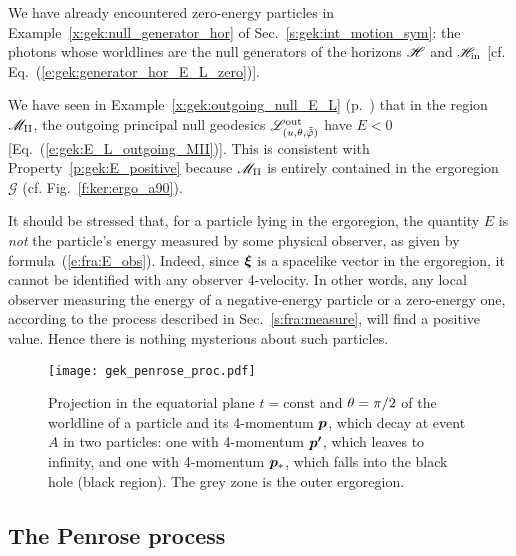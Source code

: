 \begin{example}
We have already encountered zero-energy particles in Example~\ref{x:gek:null_generator_hor} of Sec.~\ref{s:gek:int_motion_sym}: the photons whose worldlines are the null generators of the horizons $\mathscr{H}$
and $\mathscr{H}_{\rm in}$ [cf. Eq.~(\ref{e:gek:generator_hor_E_L_zero})].
\end{example}

\begin{example}
We have seen in Example~\ref{x:gek:outgoing_null_E_L} (p.~\pageref{x:gek:outgoing_null_E_L})
that in the region $\mathscr{M}_{\rm II}$, the outgoing principal null geodesics $\mathscr{L}^{\rm out}_{(u,\theta,\tilde{{\tilde\varphi}})}$ have $E<0$ [Eq.~(\ref{e:gek:E_L_outgoing_MII})]. This is consistent with
Property~\ref{p:gek:E_positive} because $\mathscr{M}_{\rm II}$ is entirely contained in the ergoregion $\mathscr{G}$
(cf. Fig.~\ref{f:ker:ergo_a90}).
\end{example}

\begin{remark}
It should be stressed that, for a particle lying in the ergoregion,
the quantity $E$ is \emph{not} the particle's energy measured by some
physical observer, as given by formula~(\ref{e:fra:E_obs}).
Indeed, since $\bm{\xi}$ is a spacelike vector in the ergoregion,
it cannot be identified with any observer
4-velocity.
In other words, any local
observer measuring the energy of a negative-energy particle or a zero-energy one, according to the process described in Sec.~\ref{s:fra:measure}, will
find a positive value. Hence there is nothing mysterious about such particles.
\end{remark}

\begin{figure}
\centerline{\texttt{[image: gek\_penrose\_proc.pdf]}}
\caption[]{\label{f:gek:penrose_proc} \footnotesize
Projection in the equatorial plane $t=\mathrm{const}$
and $\theta=\pi/2$ of the worldline of a particle and its 4-momentum $\bm{p}$,
which decay at event $A$ in two particles: one with 4-momentum
$\bm{p'}$, which leaves to infinity, and one with 4-momentum
$\bm{p}_*$, which falls into the black hole (black region).
The grey zone is the outer ergoregion.
}
\end{figure}

\subsection{The Penrose process} \label{s:gek:Penrose_proc}

